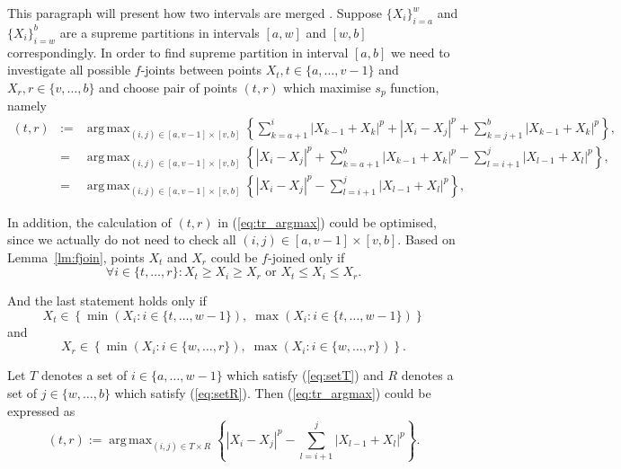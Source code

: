 \documentclass[12pt, a4paper]{article}
\DeclareMathOperator*{\argmax}{arg\,max}
\numberwithin{equation}{section}
\begin{document}
This paragraph will present how two intervals are merged .
Suppose $\{X_{i}\}_{i=a}^{w}$  and $\{X_{i}\}_{i=w}^{b}$
are a supreme partitions in intervals $[a,w]$ and $[w,b]$ correspondingly.  
In order to find supreme partition in interval $[a,b]$
we need to investigate all possible
$f$-joints between points $X_t, t\in \{a,\dots,v-1\}$ and
$X_r, r\in \{v,\dots,b\}$ and choose pair of points
$(t, r)$ which maximise $s_p$ function, namely  
\begin{eqnarray}
  (t, r) &:=& \argmax_{(i,j) \in [a, v-1] \times [v, b] } 
    \left\{ \sum_{k=a+1}^i |X_{k-1} + X_{k}|^p + |X_i-X_j|^p 
    + \sum_{k=j+1}^b |X_{k-1} + X_{k}|^p \right\}, \nonumber \\
  &=& \argmax_{(i,j) \in [a, v-1] \times [v, b] }  
    \left\{|X_i-X_j|^p +  \sum_{k=a+1}^b |X_{k-1} + X_{k}|^p  
    - \sum_{l=i+1}^j |X_{l-1} + X_{l}|^p  \right\}, \nonumber \\
   \label{eq:tr_argmax}  
   &=& \argmax_{(i,j) \in [a, v-1] \times [v, b] }  
    \left\{|X_i-X_j|^p - \sum_{l=i+1}^j |X_{l-1} + X_{l}|^p  \right\},   
\end{eqnarray}


In addition, the calculation of $(t, r)$ in (\ref{eq:tr_argmax})
could be optimised, since we actually do not need to check
all $(i,j) \in [a, v-1] \times [v, b]$. 
Based on Lemma~\ref{lm:fjoin},
points $X_t$ and $X_r$ could be $f$-joined only if 
\begin{equation}
  \forall i \in \{t,\dots,r\}: X_t \geq X_i \geq X_r \text{ or } 
  X_t \leq X_i \leq X_r.
\end{equation} 
   
And the last statement holds only if 
\begin{equation}\label{eq:setT}
  X_t \in \left\{ \min ( X_i : i \in \{t, \dots, w-1\}),\;
  \max ( X_i : i \in \{t, \dots, w-1\}) \right\}  
\end{equation}
and
\begin{equation}\label{eq:setR}
  X_r \in \left\{ \min ( X_i : i \in \{w, \dots, r\}),\;
  \max (X_i : i \in \{w, \dots, r\}) \right\}.  
\end{equation} 

Let $T$ denotes a set of $i \in \{a,\dots ,w-1\}$ which satisfy 
(\ref{eq:setT}) and $R$ denotes a set of $j \in \{w,\dots ,b\}$ which satisfy (\ref{eq:setR}).
Then (\ref{eq:tr_argmax}) 
could be expressed as
\begin{equation}
  (t, r) :=  
    \argmax_{(i,j) \in T \times R }  
    \left\{|X_i-X_j|^p - \sum_{l=i+1}^j |X_{l-1} + X_{l}|^p  \right\}.   
\end{equation} 
\end{document}
